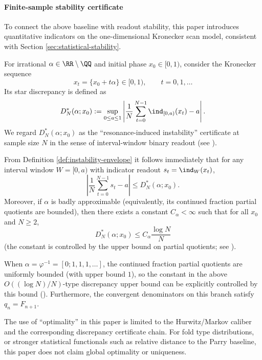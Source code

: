 \paragraph{Finite-sample stability certificate}

To connect the above baseline with readout stability, this paper introduces quantitative indicators on the one-dimensional Kronecker scan model, consistent with Section \ref{sec:statistical-stability}.

\begin{definition}\label{def:instability-envelope}
For irrational $\alpha\in\RR\setminus\QQ$ and initial phase $x_0\in[0,1)$, consider the Kronecker sequence
\[
x_t=\{x_0+t\alpha\}\in[0,1),\qquad t=0,1,\dots
\]
Its star discrepancy is defined as
\[
D_N^*(\alpha;x_0):=\sup_{0\le a\le 1}\left|\frac1N\sum_{t=0}^{N-1}\ind_{[0,a)}(x_t)-a\right|.
\]
We regard $D_N^*(\alpha;x_0)$ as the ``resonance-induced instability'' certificate at sample size $N$ in the sense of interval-window binary readout (see \cite{KuipersNiederreiter1974}).
\end{definition}

From Definition \ref{def:instability-envelope} it follows immediately that for any interval window $W=[0,a)$ with indicator readout $s_t=\ind_W(x_t)$,
\[
\left|\frac1N\sum_{t=0}^{N-1}s_t-a\right|\le D_N^*(\alpha;x_0).
\]
Moreover, if \(\alpha\) is badly approximable (equivalently, its continued fraction partial quotients are bounded), then there exists a constant \(C_\alpha<\infty\) such that for all \(x_0\) and \(N\ge 2\),
\[
D_N^*(\alpha;x_0)\le C_\alpha\frac{\log N}{N}
\]
(the constant is controlled by the upper bound on partial quotients; see \cite{KuipersNiederreiter1974}).

\begin{corollary}\label{cor:golden-branch-star-discrepancy-audit}
When \(\alpha=\varphi^{-1}=[0;1,1,1,\dots]\), the continued fraction partial quotients are uniformly bounded (with upper bound \(1\)), so the constant in the above \(O((\log N)/N)\)-type discrepancy upper bound can be explicitly controlled by this bound (\cite{KuipersNiederreiter1974}).
Furthermore, the convergent denominators on this branch satisfy \(q_n=F_{n+1}\).
\end{corollary}

\begin{remark}\label{rem:what-is-optimized}
The use of ``optimality'' in this paper is limited to the Hurwitz/Markov caliber and the corresponding discrepancy certificate chain. For fold type distributions, or stronger statistical functionals such as relative distance to the Parry baseline, this paper does not claim global optimality or uniqueness.
\end{remark}
